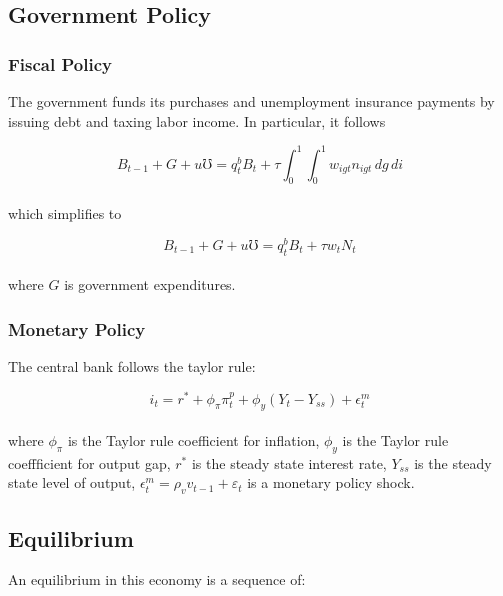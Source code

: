 \documentclass[titlepage]{\econtex}\providecommand{\texname}{BufferStockTheory}
\begin{document}
\hypertarget{Government Policy}{}
\subsection{Government Policy}



\hypertarget{Fiscal Policy}{}
\subsubsection{Fiscal Policy}

The government funds its purchases and unemployment insurance payments by issuing debt and taxing labor income. In particular, it follows 

$$ B_{t-1} + G + \mathit{u} \mho =   q^{b}_{t} B_{t} +  \tau \int_{0}^{1} \int_{0}^{1} w_{igt} n_{igt} \, dg \, di$$ \\

which simplifies to 

$$ B_{t-1} + G + \mathit{u} \mho =   q^{b}_{t} B_{t} +  \tau w_{t}N_{t}$$  \\


where $G $ is government expenditures. \\



\hypertarget{Monetary Policy}{}
\subsubsection{Monetary Policy}


The central bank follows the taylor rule: 

$$i_{t} = r^{*} +\phi_{\pi} \pi^{p}_{t} + \phi_{y} (Y_{t} - Y_{ss}) + \epsilon^{m}_{t}$$ \\

where $\phi_{\pi}$ is the Taylor rule coefficient for inflation, $\phi_{y}$ is the Taylor rule coeffficient for output gap,  $r^{*}$ is the steady state interest rate, $Y_{ss}$ is the steady state level of output,  $\epsilon^{m}_{t} = \rho_{v} v_{t-1} +\varepsilon_{t}$ is a monetary policy shock. \\

\hypertarget{Equilibrium}{}
\subsection{Equilibrium}


An equilibrium in this economy is a sequence of: \\
\end{document}
